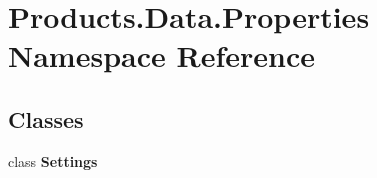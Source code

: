 \hypertarget{namespace_products_1_1_data_1_1_properties}{}\section{Products.\+Data.\+Properties Namespace Reference}
\label{namespace_products_1_1_data_1_1_properties}
\subsection*{Classes}
\begin{DoxyCompactItemize}
\item 
class {\bfseries Settings}
\end{DoxyCompactItemize}
